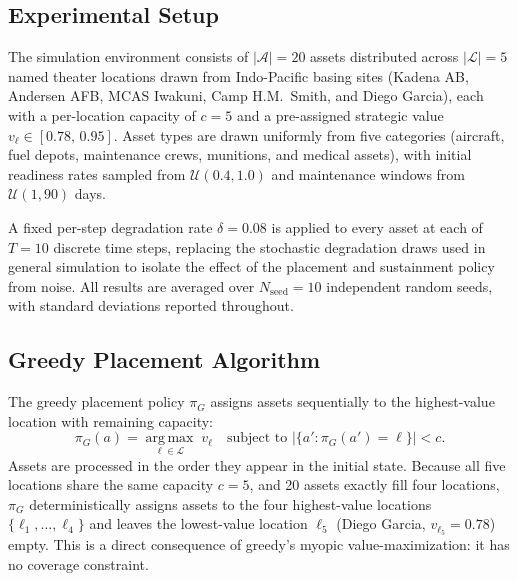 \documentclass[11pt]{article}
\begin{document}
\subsection{Experimental Setup}
\label{sec:exp1:setup}

The simulation environment consists of $|\mathcal{A}| = 20$ assets distributed
across $|\mathcal{L}| = 5$ named theater locations drawn from
Indo-Pacific basing sites (Kadena AB, Andersen AFB, MCAS Iwakuni,
Camp H.M.\ Smith, and Diego Garcia), each with a per-location capacity
of $c = 5$ and a pre-assigned strategic value
$v_\ell \in [0.78,\, 0.95]$.
Asset types are drawn uniformly from five categories (aircraft, fuel depots,
maintenance crews, munitions, and medical assets), with initial readiness
rates sampled from $\mathcal{U}(0.4, 1.0)$ and maintenance windows
from $\mathcal{U}(1, 90)$ days.

A fixed per-step degradation rate $\delta = 0.08$ is applied to every
asset at each of $T = 10$ discrete time steps, replacing the stochastic
degradation draws used in general simulation to isolate the effect of the
placement and sustainment policy from noise. All results are averaged over
$N_\mathrm{seed} = 10$ independent random seeds, with standard deviations
reported throughout.

\subsection{Greedy Placement Algorithm}
\label{sec:exp1:algorithm}

The greedy placement policy $\pi_G$ assigns assets sequentially to the
highest-value location with remaining capacity:
\begin{equation}
    \pi_G(a) = \operatorname*{arg\,max}_{\ell \in \mathcal{L}}
    \; v_\ell
    \quad \text{subject to } |\{a' : \pi_G(a') = \ell\}| < c.
    \label{eq:greedy}
\end{equation}
Assets are processed in the order they appear in the initial state. Because
all five locations share the same capacity $c = 5$, and 20 assets exactly
fill four locations, $\pi_G$ deterministically assigns assets to the four
highest-value locations $\{\ell_1, \ldots, \ell_4\}$ and leaves the
lowest-value location $\ell_5$ (Diego Garcia, $v_{\ell_5} = 0.78$) empty.
This is a direct consequence of greedy's myopic value-maximization: it has
no coverage constraint.
\end{document}
